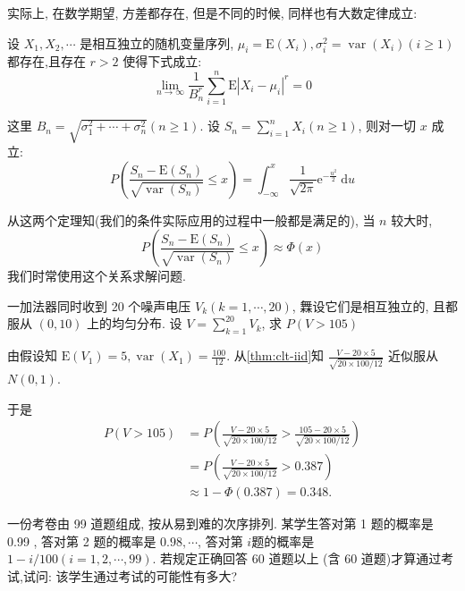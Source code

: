     实际上, 在数学期望, 方差都存在, 但是不同的时候, 同样也有大数定律成立: 

    \begin{theorem}
        \label{thm:clt-gen}
        设 $X_1, X_2, \cdots$ 是相互独立的随机变量序列, $\mu_i=\mathrm{E}\left(X_i\right), \sigma_i^2=\operatorname{var}\left(X_i\right)(i \geqslant 1)$ 都存在,且存在 $r>2$ 使得下式成立:
$$
\lim _{n \rightarrow \infty} \frac{1}{B_n^r} \sum_{i=1}^n \mathrm{E}\left|X_i-\mu_i\right|^r=0
$$

这里 $B_n=\sqrt{\sigma_1^2+\cdots+\sigma_n^2}(n \geqslant 1)$. 设 $S_n=\sum_{i=1}^n X_i(n \geqslant 1)$, 则对一切 $x$ 成立:
$$
P\left(\frac{S_n-\mathrm{E}\left(S_n\right)}{\sqrt{\operatorname{var}\left(S_n\right)}} \leq x\right)=\int_{-\infty}^x \frac{1}{\sqrt{2 \pi}} \mathrm{e}^{-\frac{u^2}{2}} \mathrm{~d} u
$$
    \end{theorem}

    从这两个定理知(我们的条件实际应用的过程中一般都是满足的), 当 $n$ 较大时,
$$
P\left(\frac{S_n-\mathrm{E}\left(S_n\right)}{\sqrt{\operatorname{var}\left(S_n\right)}} \leq x\right) \approx \Phi(x)
$$
     我们时常使用这个关系求解问题. 

     \begin{example}
        一加法器同时收到 20 个噪声电压 $V_k(k=1, \cdots, 20)$, 橆设它们是相互独立的, 且都服从 $(0,10)$ 上的均匀分布. 设 $V=\sum_{k=1}^{20} V_k$, 求 $P(V>105)$
     \end{example}

     \begin{solution}
        由假设知 $\mathrm{E}\left(V_1\right)=5, \operatorname{var}\left(X_1\right)=\frac{100}{12}$. 从\cref{thm:clt-iid}知 $\frac{V-20 \times 5}{\sqrt{20 \times 100 / 12}}$ 近似服从 $N(0,1)$.

        于是
        $$
        \begin{aligned}
        P(V>105) & =P\left(\frac{V-20 \times 5}{\sqrt{20 \times 100 / 12}}>\frac{105-20 \times 5}{\sqrt{20 \times 100 / 12}}\right) \\
        & =P\left(\frac{V-20 \times 5}{\sqrt{20 \times 100 / 12}}>0.387\right) \\
        & \approx 1-\Phi(0.387)=0.348 .
        \end{aligned}
        $$ 
     \end{solution}


     \begin{example}
        一份考卷由 99 道题组成, 按从易到难的次序排列. 某学生答对第 1 题的概率是 0.99 , 答对第 2 题的概率是 $0.98, \cdots$, 答对第 $i$题的概率是 $1-i / 100(i=1,2, \cdots, 99)$. 若规定正确回答 60 道题以上 (含 60 道题)才算通过考试,试问: 该学生通过考试的可能性有多大?
     \end{example}

